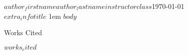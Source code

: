 \documentclass[12pt,letterpaper]{article}
\newenvironment{hangingpar}[1]
  {\begin{list}
          {}
          {\setlength{\itemindent}{-#1}%
           \setlength{\leftmargin}{#1}%
           \setlength{\itemsep}{0pt}%
           \setlength{\parsep}{\parskip}%
           \setlength{\topsep}{\parskip}%
           }
    \setlength{\parindent}{-#1}%
    \item[]
  }
  {\end{list}}
\begin{document}
\begin{mla}{$author_firstname$}{$author_lastname$}{$instructor$}{$class$}{\today\\$extra_info$}{$title$}
\openup 1em
$body$
\pagebreak
\begin{center}
Works Cited
\end{center}
\begin{hangingpar}{0.5in}
$works_cited$
\end{hangingpar}
\end{mla}
\end{document}
